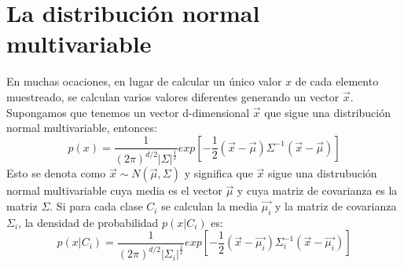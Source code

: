 \documentclass[a4paper, 11pt, oneside]{report}
\begin{document}
\section{La distribución normal multivariable}
\label{sect:multivar}

En muchas ocaciones, en lugar de calcular un único valor $x$ de cada elemento muestreado, se calculan varios valores diferentes generando un vector $\vec{x}$. Supongamos que tenemos un vector d-dimensional $\vec{x}$ que sigue una distribución normal multivariable, entonces:
	\begin{equation}\label{eq:multDens}
		p(x) = \frac{1}{(2\pi)^{d/2}|\Sigma|^\frac{1}{2}} exp\left[{-\frac{1}{2}(\vec{x}-\vec{\mu})\Sigma^{-1}(\vec{x}-\vec{\mu})}\right]
	\end{equation}
Esto se denota como $\vec{x} \sim N(\vec{\mu},\Sigma)$ y significa que $\vec{x}$ sigue una distrubución normal multivariable cuya media es el vector $\vec{\mu}$ y cuya matriz de covarianza es la matriz $\Sigma$. Si para cada clase $C_i$ se calculan la media $\vec{\mu_i}$ y la matriz de covarianza $\Sigma_i$, la densidad de probabilidad $p(x|C_i)$ es:
	\begin{equation}\label{eq:multivariate}
		p(x|C_i) = \frac{1}{(2\pi)^{d/2}|\Sigma_i|^\frac{1}{2}} exp\left[{-\frac{1}{2}(\vec{x}-\vec{\mu_i})\Sigma_i^{-1}(\vec{x}-\vec{\mu_i})}\right]
	\end{equation}
	
\end{document}
